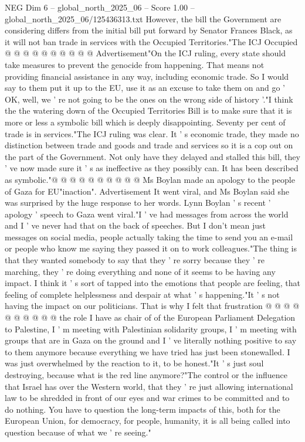 \begin{textsample}{NEG Dim 6 – global\_north\_2025\_06 – Score 1.00 – global\_north\_2025\_06/125436313.txt}
However, the bill the Government are considering differs from the initial bill put forward by Senator Frances Black, as it will not ban trade in services with the Occupied Territories."The ICJ Occupied @ @ @ @ @ @ @ @ @ @ Advertisement"On the ICJ ruling, every state should take measures to prevent the genocide from happening.
That means not providing financial assistance in any way, including economic trade.
So I would say to them put it up to the EU, use it as an excuse to take them on and go ' OK, well, we ' re not going to be the ones on the wrong side of history '."I think the the watering down of the Occupied Territories Bill is to make sure that it is more or less a symbolic bill which is deeply disappointing.
Seventy per cent of trade is in services."The ICJ ruling was clear.
It ' s economic trade, they made no distinction between trade and goods and trade and services so it is a cop out on the part of the Government.
Not only have they delayed and stalled this bill, they ' ve now made sure it ' s as ineffective as they possibly can.
It has been described as symbolic."@ @ @ @ @ @ @ @ @ @ Ms Boylan made an apology to the people of Gaza for EU"inaction".
Advertisement It went viral, and Ms Boylan said she was surprised by the huge response to her words.
Lynn Boylan ' s recent ' apology ' speech to Gaza went viral."I ' ve had messages from across the world and I ' ve never had that on the back of speeches.
But I don't mean just messages on social media, people actually taking the time to send you an e-mail or people who know me saying they passed it on to work colleagues."The thing is that they wanted somebody to say that they ' re sorry because they ' re marching, they ' re doing everything and none of it seems to be having any impact.
I think it ' s sort of tapped into the emotions that people are feeling, that feeling of complete helplessness and despair at what ' s happening."It ' s not having the impact on our politicians.
That is why I felt that frustration @ @ @ @ @ @ @ @ @ @ the role I have as chair of of the European Parliament Delegation to Palestine, I ' m meeting with Palestinian solidarity groups, I ' m meeting with groups that are in Gaza on the ground and I ' ve literally nothing positive to say to them anymore because everything we have tried has just been stonewalled.
I was just overwhelmed by the reaction to it, to be honest."It ' s just soul destroying, because what is the red line anymore?"The control or the influence that Israel has over the Western world, that they ' re just allowing international law to be shredded in front of our eyes and war crimes to be committed and to do nothing.
You have to question the long-term impacts of this, both for the European Union, for democracy, for people, humanity, it is all being called into question because of what we ' re seeing."

\end{textsample}
